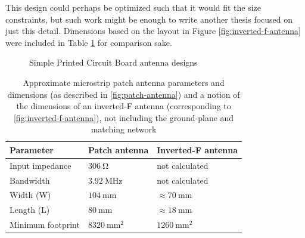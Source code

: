 This design could perhaps be optimized such that it would fit the size constraints, but such work might be enough to write another thesis focused on just this detail. Dimensions based on the layout in Figure \ref{fig:inverted-f-antenna} were included in Table \ref{table:antenna-pcb-calculations} for comparison sake.

\begin{figure}
    \centering
    \hfill
    \caption{Simple Printed Circuit Board antenna designs}
\end{figure}

\begin{table}[H]
\begin{center}
\caption{\label{table:antenna-pcb-calculations}Approximate microstrip patch antenna parameters and dimensions (as described in \ref{fig:patch-antenna}) and a notion of the dimensions of an inverted-F antenna (corresponding to \ref{fig:inverted-f-antenna}), not including the ground-plane and matching network}
    \begin{tabular}{|l|l|l|} \hline
    \textbf{Parameter}  & \textbf{Patch antenna}    & \textbf{Inverted-F antenna} \\ \hline
    Input impedance     & $306~\mathrm{\Omega}$     & not calculated \\ \hline
    Bandwidth           & $3.92~\mathrm{MHz}$       & not calculated \\ \hline
    Width (W)           & $104~\mathrm{mm}$         & $\approx 70~\mathrm{mm}$ \\ \hline
    Length (L)          & $80~\mathrm{mm}$          & $\approx 18~\mathrm{mm}$ \\ \hline
    Minimum footprint   & $8320~\mathrm{mm^2}$      & $1260~\mathrm{mm^2}$ \\ \hline
    \end{tabular}
\end{center}
\end{table}

